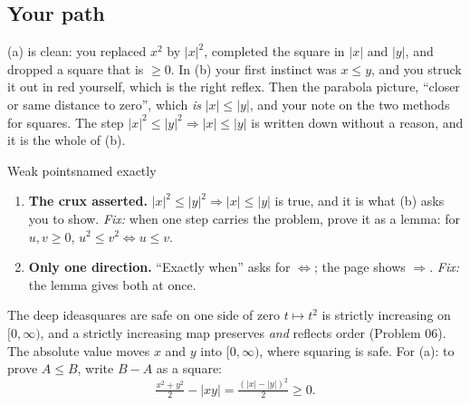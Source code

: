 \documentclass{kaelearn}
\begin{document}
\subsection{Your path}
(a) is clean: you replaced $x^2$ by $|x|^2$, completed the square in $|x|$ and $|y|$, and dropped a square that is
$\ge0$. In (b) your first instinct was $x\le y$, and you struck it out in red yourself, which is the right reflex.
Then the parabola picture, ``closer or same distance to zero'', which \emph{is} $|x|\le|y|$, and your note on the two
methods for squares. The step $|x|^2\le|y|^2\Rightarrow|x|\le|y|$ is written down without a reason, and it is the
whole of (b).

\begin{panel}[unbreakable]{Weak points}{named exactly}{}
\begin{enumerate}
  \item \textbf{The crux asserted.} $|x|^2\le|y|^2\Rightarrow|x|\le|y|$ is true, and it is what (b) asks you to show.
        \emph{Fix:} when one step carries the problem, prove it as a lemma: for $u,v\ge0$, $u^2\le v^2\Leftrightarrow u\le v$.
  \item \textbf{Only one direction.} ``Exactly when'' asks for $\Leftrightarrow$; the page shows $\Rightarrow$.
        \emph{Fix:} the lemma gives both at once.
\end{enumerate}
\end{panel}

\begin{panel}[unbreakable]{The deep idea}{squares are safe on one side of zero}{}
$t\mapsto t^2$ is strictly increasing on $[0,\infty)$, and a strictly increasing map preserves \emph{and} reflects order
(Problem 06). The absolute value moves $x$ and $y$ into $[0,\infty)$, where squaring is safe. For (a): to prove
$A\le B$, write $B-A$ as a square:
\[\tfrac{x^2+y^2}{2}-|xy|=\tfrac{(|x|-|y|)^2}{2}\ge0.\]
\end{panel}

\begin{center}
\end{center}
\end{document}

